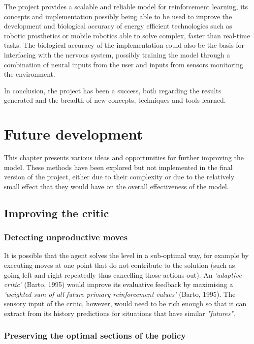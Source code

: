 \documentclass[10pt]{article}
\begin{document}
    The project provides a scalable and reliable model for reinforcement learning, its concepts and implementation possibly being able to be used to improve the development and biological accuracy of energy efficient technologies such as robotic prosthetics or mobile robotics able to solve complex, faster than real-time tasks. The biological accuracy of the implementation could also be the basis for interfacing with the nervous system, possibly training the model through a combination of neural inputs from the user and inputs from sensors monitoring the environment.

    In conclusion, the project has been a success, both regarding the results generated and the breadth of new concepts, techniques and tools learned.

    \section{Future development}

    This chapter presents various ideas and opportunities for further improving the model. These methods have been explored but not implemented in the final version of the project, either due to their complexity or due to the relatively small effect that they would have on the overall effectiveness of the model.

    \subsection{Improving the critic}

    \subsubsection{Detecting unproductive moves}

    It is possible that the agent solves the level in a sub-optimal way, for example by executing moves at one point that do not contribute to the solution (such as going left and right repeatedly thus cancelling those actions out). An \textit{'adaptive critic'} (Barto, 1995) would improve its evaluative feedback by maximising a \textit{'weighted sum of all future primary reinforcement values'} (Barto, 1995). The sensory input of the critic, however, would need to be rich enough so that it can extract from its history predictions for situations that have similar \textit{"futures"}.

    \subsubsection{Preserving the optimal sections of the policy}
\end{document}
